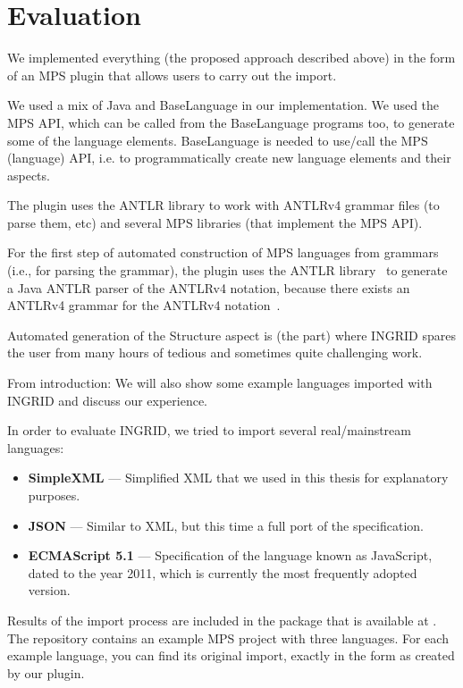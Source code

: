 \section{Evaluation}
\label{sect:EVAL}


We implemented everything (the proposed approach described above) in the form of an MPS plugin that allows users to carry out the import.

We used a mix of Java and BaseLanguage in our implementation.
We used the MPS API, which can be called from the BaseLanguage programs too, to generate some of the language elements.
BaseLanguage is needed to use/call the MPS (language) API, i.e. to programmatically create new language elements and their aspects.

The plugin uses the ANTLR library to work with ANTLRv4 grammar files (to parse them, etc) and several MPS libraries (that implement the MPS API).

For the first step of automated construction of MPS languages from grammars (i.e., for parsing the grammar), the plugin uses the ANTLR library~\cite{ref:ANTLR4} to generate a Java ANTLR parser of the ANTLRv4 notation, because there exists an ANTLRv4 grammar for the ANTLRv4 notation~\cite{ref:ANTLR4reference}.



Automated generation of the Structure aspect is (the part) where INGRID spares the user from many hours of tedious and sometimes quite challenging work.


From introduction: We will also show some example languages imported with INGRID and discuss our experience.

In order to evaluate INGRID, we tried to import several real/mainstream languages:
\begin{itemize}
	\item \textbf{SimpleXML} --- Simplified XML that we used in this thesis for explanatory purposes.
	\item \textbf{JSON} --- Similar to XML, but this time a full port of the specification.
	\item \textbf{ECMAScript 5.1} --- Specification of the language known as JavaScript, dated to the year 2011, which is currently the most frequently adopted version.
\end{itemize}
Results of the import process are included in the package that is available at .
The repository  contains an example MPS project with three languages.
For each example language, you can find its original import, exactly in the form as created by our plugin.

